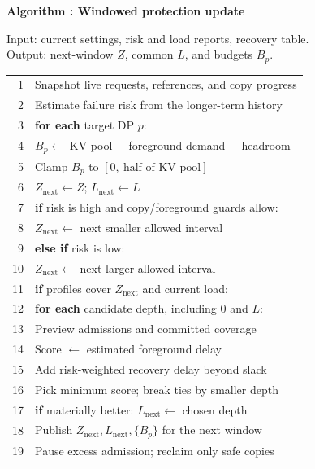 \begin{figure}[t]
  \raggedright
  \label{alg:adapter}
  \noindent\textbf{Algorithm \thedesignalgorithm: Windowed protection update}
  \par\smallskip
  \noindent Input: current settings, risk and load reports, recovery table.
  Output: next-window $Z$, common $L$, and budgets $B_p$.
  \par\smallskip
  \begin{tabularx}{\columnwidth}{@{}r@{\quad}X@{}}
    \toprule
    1 & Snapshot live requests, references, and copy progress \\
    2 & Estimate failure risk from the longer-term history \\
    3 & \textbf{for each} target DP $p$: \\
    4 & \quad$B_p\gets$ KV pool $-$ foreground demand $-$ headroom \\
    5 & \quad Clamp $B_p$ to $[0,\ \text{half of KV pool}]$ \\
    6 & $Z_{\mathrm{next}}\gets Z$; $L_{\mathrm{next}}\gets L$ \\
    7 & \textbf{if} risk is high and copy/foreground guards allow: \\
    8 & \quad$Z_{\mathrm{next}}\gets$ next smaller allowed interval \\
    9 & \textbf{else if} risk is low: \\
    10 & \quad$Z_{\mathrm{next}}\gets$ next larger allowed interval \\
    11 & \textbf{if} profiles cover $Z_{\mathrm{next}}$ and current load: \\
    12 & \quad\textbf{for each} candidate depth, including $0$ and $L$: \\
    13 & \qquad Preview admissions and committed coverage \\
    14 & \qquad Score $\gets$ estimated foreground delay \\
    15 & \qquad Add risk-weighted recovery delay beyond slack \\
    16 & \quad Pick minimum score; break ties by smaller depth \\
    17 & \quad \textbf{if} materially better: $L_{\mathrm{next}}\gets$ chosen depth \\
    18 & Publish $Z_{\mathrm{next}},L_{\mathrm{next}},\{B_p\}$ for the next window \\
    19 & Pause excess admission; reclaim only safe copies \\
    \bottomrule
  \end{tabularx}
\end{figure}

